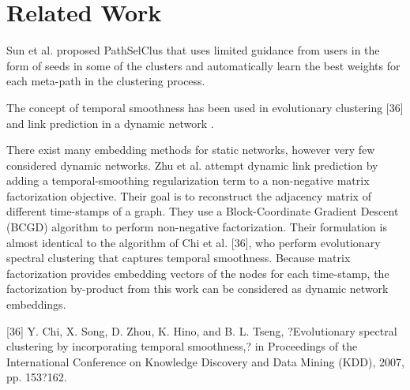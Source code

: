 \section{Related Work}

\cite{Zhu2016} \cite{sun2011pathsim} \cite{Sun:2012:HRP:2124295.2124373} \cite{huang2016meta}
\cite{wang2016relsim} \cite{sun2013pathselclus} \cite{sun2011ASONAM} \cite{Yang2012} \cite{liben2007link}

Sun et al. proposed PathSelClus \cite{sun2013pathselclus} that uses limited guidance from users in the form of seeds in some of the clusters and automatically learn the best weights for each meta-path in the clustering process.

The concept of temporal smoothness has been used in evolutionary clustering [36] and link prediction in a dynamic network \cite{Zhu2016}.

There exist many embedding methods for static networks, however very few considered dynamic networks. Zhu et al. \cite{Zhu2016} attempt dynamic link prediction by adding a temporal-smoothing regularization term to a non-negative matrix factorization objective. Their goal is to reconstruct the adjacency matrix of different time-stamps of a graph. They use a Block-Coordinate Gradient Descent (BCGD) algorithm to perform non-negative factorization. Their formulation is almost identical to the algorithm of Chi et al. [36], who perform evolutionary spectral clustering that captures temporal smoothness. Because matrix factorization provides embedding vectors of the nodes for each time-stamp, the factorization by-product from this work can be considered as dynamic network embeddings.

[36] Y. Chi, X. Song, D. Zhou, K. Hino, and B. L. Tseng, ?Evolutionary spectral clustering by incorporating temporal smoothness,? in Proceedings of the International Conference on Knowledge Discovery and Data Mining (KDD), 2007, pp. 153?162.





